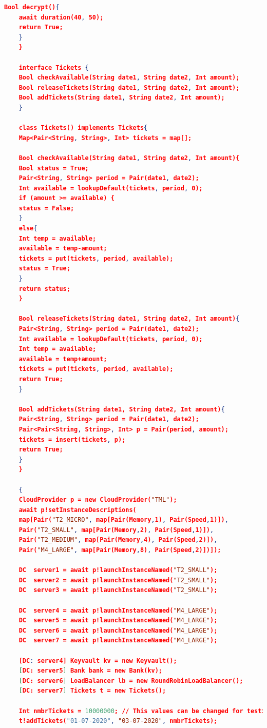 \documentclass[conference]{IEEEtran}
\begin{document}
\begin{appendices}
\begin{lstlisting}[language=json]
	Bool decrypt(){
	await duration(40, 50);
	return True;
	}
	}
	
	interface Tickets {
	Bool checkAvailable(String date1, String date2, Int amount);
	Bool releaseTickets(String date1, String date2, Int amount);
	Bool addTickets(String date1, String date2, Int amount);
	}
	
	class Tickets() implements Tickets{
	Map<Pair<String, String>, Int> tickets = map[];
	
	Bool checkAvailable(String date1, String date2, Int amount){
	Bool status = True;
	Pair<String, String> period = Pair(date1, date2);
	Int available = lookupDefault(tickets, period, 0);
	if (amount >= available) {
	status = False;
	}
	else{
	Int temp = available;
	available = temp-amount;
	tickets = put(tickets, period, available);
	status = True;
	}
	return status;
	}
	
	Bool releaseTickets(String date1, String date2, Int amount){
	Pair<String, String> period = Pair(date1, date2);
	Int available = lookupDefault(tickets, period, 0);
	Int temp = available;
	available = temp+amount;
	tickets = put(tickets, period, available);
	return True;
	}
	
	Bool addTickets(String date1, String date2, Int amount){
	Pair<String, String> period = Pair(date1, date2);
	Pair<Pair<String, String>, Int> p = Pair(period, amount);
	tickets = insert(tickets, p);
	return True;
	}
	}
	
	{
	CloudProvider p = new CloudProvider("TML");
	await p!setInstanceDescriptions(
	map[Pair("T2_MICRO", map[Pair(Memory,1), Pair(Speed,1)]),
	Pair("T2_SMALL", map[Pair(Memory,2), Pair(Speed,1)]),
	Pair("T2_MEDIUM", map[Pair(Memory,4), Pair(Speed,2)]),
	Pair("M4_LARGE", map[Pair(Memory,8), Pair(Speed,2)])]);
	
	DC  server1 = await p!launchInstanceNamed("T2_SMALL");
	DC  server2 = await p!launchInstanceNamed("T2_SMALL");
	DC  server3 = await p!launchInstanceNamed("T2_SMALL");
	
	DC  server4 = await p!launchInstanceNamed("M4_LARGE");
	DC  server5 = await p!launchInstanceNamed("M4_LARGE");
	DC  server6 = await p!launchInstanceNamed("M4_LARGE");
	DC  server7 = await p!launchInstanceNamed("M4_LARGE");
	
	[DC: server4] Keyvault kv = new Keyvault();
	[DC: server5] Bank bank = new Bank(kv);
	[DC: server6] LoadBalancer lb = new RoundRobinLoadBalancer();
	[DC: server7] Tickets t = new Tickets();
	
	Int nmbrTickets = 10000000;	// This values can be changed for testing purposes
	t!addTickets("01-07-2020", "03-07-2020", nmbrTickets);
	

\end{lstlisting}
\end{appendices}
\end{document}
